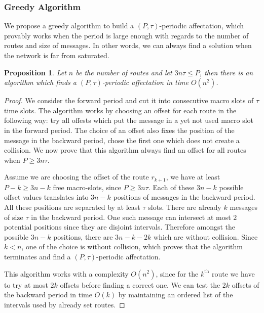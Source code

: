 \documentclass[a4paper,10pt]{article}
\newtheorem{proposition}{Proposition}
\begin{document}
    \subsubsection{Greedy Algorithm}
    
    We propose a greedy algorithm to build a $(P,\tau)$-periodic affectation, which provably works when
    the period is large enough with regards to the number of routes and size of messages. In other words, 
    we can always find a solution when the network is far from saturated. 
    
    \begin{proposition}
    Let  $n$ be the number of routes and let $ 3n\tau \leq P$, then there is an algorithm which finds a $(P,\tau)$-periodic affectation in time $O(n^2)$.
    \end{proposition}
    \begin{proof}
     We consider the forward period and cut it into consecutive macro slots of $\tau$ time slots. The algorithm works by choosing an offset for each route in the following way: try all offests which put the message in a yet not used macro slot in the forward
     period. The choice of an offset also fixes the position of the message in the backward period, chose the first one which does not create a collision. We now prove that this algorithm always find an offset for all routes when $P \geq 3n\tau$.
     
     Assume we are choosing the offset of the route $r_{k+1}$, we have  at least $P - k \geq 3n - k$ free macro-slots, since $P \geq 3n\tau$. Each of these $3n - k$ possible offset values translates into $3n - k$ positions of messages in the backward period. All these positions are separated by at least $\tau$ slots. There are already $k$ messages of size $\tau$ in the backward period. One such message can intersect at most $2$ potential positions since they are disjoint intervals. Therefore  amongst the possible $3n - k$ positions, there are  $3n - k -2k$ which are without collision. Since $k < n$, one of the choice is without collision, which proves that the algorithm terminates and find a  $(P,\tau)$-periodic affectation. 
     
     This algorithm works with a complexity $O(n^2)$, since for the $k^{\text{th}}$ route we have to try at most $2k$ offsets before finding a correct one. We can test the $2k$ offsets of the backward period in time $O(k)$ by maintaining an ordered list of the intervals used by already set routes.
     \end{proof}
     
\end{document}
